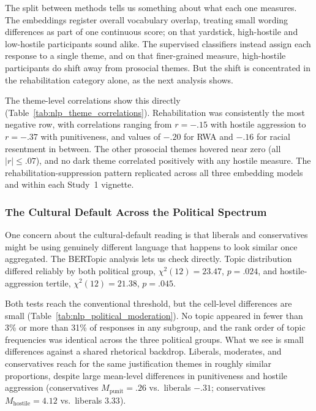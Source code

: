 The split between methods tells us something about what each one measures. The embeddings register overall vocabulary overlap, treating small wording differences as part of one continuous score; on that yardstick, high-hostile and low-hostile participants sound alike. The supervised classifiers instead assign each response to a single theme, and on that finer-grained measure, high-hostile participants do shift away from prosocial themes. But the shift is concentrated in the rehabilitation category alone, as the next analysis shows.

The theme-level correlations show this directly (Table~\ref{tab:nlp_theme_correlations}). Rehabilitation was consistently the most negative row, with correlations ranging from $r = -.15$ with hostile aggression to $r = -.37$ with punitiveness, and values of $-.20$ for RWA and $-.16$ for racial resentment in between. The other prosocial themes hovered near zero (all $|r| \leq .07$), and no dark theme correlated positively with any hostile measure. The rehabilitation-suppression pattern replicated across all three embedding models and within each Study~1 vignette.

\subsubsection{The Cultural Default Across the Political Spectrum}

One concern about the cultural-default reading is that liberals and conservatives might be using genuinely different language that happens to look similar once aggregated. The BERTopic analysis lets us check directly. Topic distribution differed reliably by both political group, $\chi^2(12) = 23.47$, $p = .024$, and hostile-aggression tertile, $\chi^2(12) = 21.38$, $p = .045$.

Both tests reach the conventional threshold, but the cell-level differences are small (Table~\ref{tab:nlp_political_moderation}). No topic appeared in fewer than 3\% or more than 31\% of responses in any subgroup, and the rank order of topic frequencies was identical across the three political groups. What we see is small differences against a shared rhetorical backdrop. Liberals, moderates, and conservatives reach for the same justification themes in roughly similar proportions, despite large mean-level differences in punitiveness and hostile aggression (conservatives $M_{\textrm{punit}} = .26$ vs.\ liberals $-.31$; conservatives $M_{\textrm{hostile}} = 4.12$ vs.\ liberals $3.33$).

